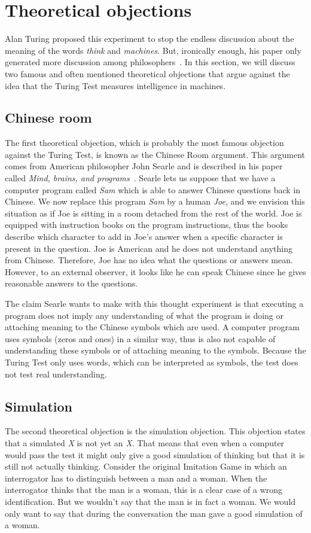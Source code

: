 \section{Theoretical objections}

Alan Turing proposed this experiment to stop the endless discussion about the meaning of the words \textit{think} and \textit{machines}. But, ironically enough, his paper only generated more discussion among philosophers~\cite{dennett2004can}. In this section, we will discuss two famous and often mentioned theoretical objections that argue against the idea that the Turing Test measures intelligence in machines.

\subsection{Chinese room}
The first theoretical objection, which is probably the most famous objection against the Turing Test, is known as the Chinese Room argument. This argument comes from American philosopher John Searle and is described in his paper called \textit{Mind, brains, and programs}~\cite{copeland2015artificial}. Searle lets us suppose that we have a computer program called \textit{Sam} which is able to answer Chinese questions back in Chinese. We now replace this program \textit{Sam} by a human \textit{Joe}, and we envision this situation as if Joe is sitting in a room detached from the rest of the world. Joe is equipped with instruction books on the program instructions, thus the books describe which character to add in Joe's answer when a specific character is present in the question. Joe is American and he does not understand anything from Chinese. Therefore, Joe has no idea what the questions or answers mean. However, to an external observer, it looks like he can speak Chinese since he gives reasonable answers to the questions.

The claim Searle wants to make with this thought experiment is that executing a program does not imply any understanding of what the program is doing or attaching meaning to the Chinese symbols which are used. A computer program uses symbols (zeros and ones) in a similar way, thus is also not capable of understanding these symbols or of attaching meaning to the symbols. Because the Turing Test only uses words, which can be interpreted as symbols, the test does not test real understanding.


\subsection{Simulation}
The second theoretical objection is the simulation objection. This objection states that a simulated \textit{X} is not yet an \textit{X}. That means that even when a computer would pass the test it might only give a good simulation of thinking but that it is still not actually thinking. Consider the original Imitation Game in which an interrogator has to distinguish between a man and a woman. When the interrogator thinks that the man is a woman, this is a clear case of a wrong identification. But we wouldn't say that the man is in fact a woman. We would only want to say that during the conversation the man gave a good simulation of a woman.

